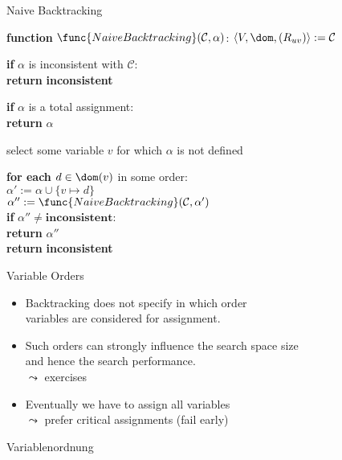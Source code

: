 \begin{frame}{Naive Backtracking}
  \small
  \begin{block}{\textbf{function} $\func{NaiveBacktracking}(\mathcal{C},
      \alpha)$:}
    $\langle V, \dom, (R_{uv})\rangle := \mathcal{C}$

    \smallskip

    \textbf{if} $\alpha$ is inconsistent with $\mathcal{C}$:\\
    \ind\textbf{return} \textbf{inconsistent}

    \smallskip

    \textbf{if} $\alpha$ is a total assignment:\\
    \ind\textbf{return} $\alpha$

    \smallskip

    select \alert{some variable} $v$ for which $\alpha$ is not
    defined

    \smallskip

    \textbf{for each} $d \in \dom(v)$ \alert{in some order}:\\
    \ind$\alpha' := \alpha \cup \{v \mapsto d\}$\\
    \ind$\alpha'' := \func{NaiveBacktracking}(\mathcal{C},\alpha')$\\
    \ind\textbf{if} $\alpha'' \neq \textbf{inconsistent}$:\\
    \indtwo\textbf{return} $\alpha''$\\
    \textbf{return} \textbf{inconsistent}
  \end{block}
\end{frame}

\begin{frame}{Variable Orders}
  \begin{itemize}
  \item Backtracking does not specify in which order  \\
    \alert{variables} are considered for assignment.
    \item Such orders can strongly influence the search space size \\
    and hence the search performance.  \\
    $\leadsto$  exercises
    \item Eventually we have to assign all variables\\
    $\leadsto$ prefer critical assignments (\alert{fail early})
  \end{itemize}
   Variablenordnung
\end{frame}



